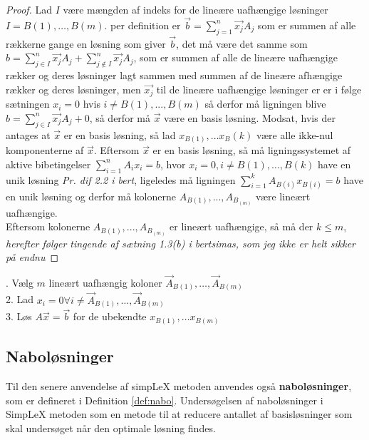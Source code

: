 \begin{proof}
Lad $I$ være mængden af indeks for de lineære uafhængige løsninger$I={B(1),\dots,B(m)}$. per definition er $\vec{b}=\sum_{j=1}^{n}\vec{x_j}A_j$ som er summen af alle rækkerne gange en løsning som giver $\vec{b}$, det må være det samme som $b=\sum_{j\in I}^{n}\vec{x_j}A_j+\sum_{j\notin I}^{n}\vec{x_j}A_j$, som er summen af alle de lineære uafhængige rækker og deres løsninger lagt sammen med summen af de lineære afhængige rækker og deres løsninger, men $\vec{x_j}$ til de lineære uafhængige løsninger er er i følge sætningen $x_i = 0$ hvis $i \neq B(1),...,B(m)$ så derfor må ligningen blive $b=\sum_{j\in I}^{n}\vec{x_j}A_j+0$, så derfor må $\vec{x}$ være en basis løsning.
Modsat, hvis der antages at $\vec{x}$ er en basis løsning, så lad $x_{B(1)},\dots x_B(k)$ være alle ikke-nul komponenterne af $\vec{x}$. Eftersom $\vec{x}$ er en basis løsning, så må ligningssystemet af aktive bibetingelser $\sum_{i=1}^{n}A_ix_i=b$, hvor $x_i=0, i\neq B(1),\dots , B(k)$ have en unik løsning \textit{Pr. dif 2.2 i bert}, ligeledes må ligningen $\sum_{i=1}^{k}A_{B(i)}x_{B(i)}=b$ have en unik løsning og derfor må kolonerne $A_{B(1)}, ..., A_{B_(m)}$ være lineært uafhængige.\\
Eftersom kolonerne $A_{B(1)}, ..., A_{B_(m)}$ er lineært uafhængige, så må der $k\leq m$, \textit{herefter følger tingende af sætning 1.3(b) i bertsimas, som jeg ikke er helt sikker på endnu}
\end{proof}

\begin{alg}
. Vælg $m$ lineært uafhængig koloner $\vec{A}_{B(1)},\dots,\vec{A}_{B(m)}$\\
2. Lad $x_i=0\forall i\neq\vec{A}_{B(1)},\dots,\vec{A}_{B(m)}$\\
3. Løs $A\vec{x}=\vec{b}$ for de ubekendte $x_{B(1)},\dots x_{B(m)}$
\end{alg}

\subsection{Naboløsninger}

Til den senere anvendelse af simpLeX metoden anvendes også \textbf{naboløsninger}, som er defineret i Definition \ref{def:nabo}. Undersøgelsen af naboløsninger i SimpLeX metoden som en metode til at reducere antallet af basisløsninger som skal undersøget når den optimale løsning findes. 

